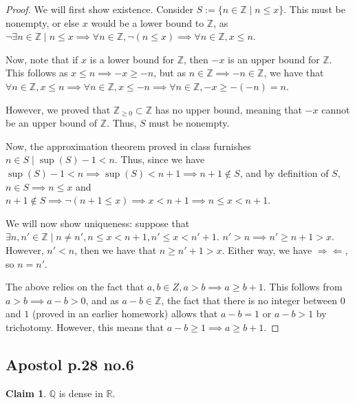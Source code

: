 \documentclass[12pt,letterpaper]{article}
\theoremstyle{definition}
\newtheorem*{claim}{Claim}
\newcommand{\contra}{\Rightarrow\!\Leftarrow}
\newcommand{\R}{\mathbb{R}}
\newcommand{\Z}{\mathbb{Z}}
\newcommand{\Ze}{\mathbb{Z}_{\geq 0}}
\newcommand{\Q}{\mathbb{Q}}
\begin{document}
\begin{proof}
  We will first show existence. Consider $S := \{n \in \Z \mid n \leq x\}$. This
  must be nonempty, or else $x$ would be a lower bound to $\Z$, as $\neg \exists
  n \in \Z \mid n \leq x \implies \forall n \in \Z, \neg(n \leq x) \implies
  \forall n \in \Z, x \leq n$.

  Now, note that if $x$ is a lower bound for $\Z$, then $-x$ is an upper bound
  for $\Z$. This follows as $x \leq n \implies -x \geq -n$, but as $n \in \Z \implies
  -n \in \Z$, we have that $\forall n \in \Z, x \leq n \implies \forall n \in
  \Z, x \leq -n \implies \forall n \in \Z, -x \geq -(-n) = n$.

  However, we proved that $\Ze \subset \Z$ has no upper bound, meaning that $-x$
  cannot be an upper bound of $\Z$. Thus, $S$ must be nonempty.

  Now, the approximation theorem proved in class furnishes $n \in S \mid
  \sup(S) - 1 < n$. Thus, since we have $\sup(S) - 1 < n \implies \sup(S) < n +
  1 \implies n + 1 \notin S$, and by definition of $S$, $n \in S \implies n \leq x$
  and $n+1 \notin S \implies \neg(n + 1 \leq x) \implies x < n + 1 \implies n
  \leq x < n+1$.

  We will now show uniqueness: suppose that $\exists n, n' \in \Z \mid n \neq n', n \leq x
  < n+1, n' \leq x < n'+1$. $n' > n \implies n' \geq n + 1 > x$. However, $n' <
  n$, then we have that $n \geq n' + 1 > x$. Either way, we have $\contra$, so
  $n = n'$.

  The above relies on the fact that $a,b \in Z, a > b \implies a \geq b + 1$.
  This follows from $a > b \implies a - b > 0$, and as $a - b \in \Z$,
  the fact that there is no integer between $0$ and $1$ (proved in an earlier
  homework) allows that $a - b = 1$ or $a - b > 1$ by trichotomy. However, this
  means that $a-b \geq 1 \implies a \geq b + 1$.
\end{proof}

\subsection*{Apostol p.28 no.6}

\begin{claim}
  $\Q$ is dense in $\R$.
\end{claim}
\end{document}
